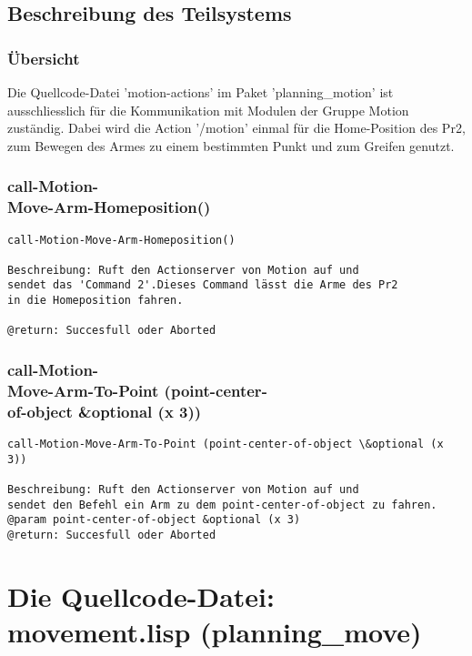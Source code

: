 \documentclass{suturo}
\begin{document}
\subsection{Beschreibung des Teilsystems}
\subsubsection{\"Ubersicht}
Die Quellcode-Datei 'motion-actions' im Paket 'planning\_motion'  ist ausschliesslich für die Kommunikation mit Modulen der Gruppe Motion zuständig. Dabei wird die Action '/motion' einmal für die Home-Position des Pr2, zum Bewegen des Armes zu einem bestimmten Punkt und zum Greifen genutzt.


\subsubsection{call-Motion-\\
Move-Arm-Homeposition()}
\begin{verbatim}
call-Motion-Move-Arm-Homeposition()

Beschreibung: Ruft den Actionserver von Motion auf und
sendet das 'Command 2'.Dieses Command lässt die Arme des Pr2 
in die Homeposition fahren.

@return: Succesfull oder Aborted
\end{verbatim}



\subsubsection{call-Motion-\\
Move-Arm-To-Point (point-center-\\of-object \&optional (x 3))
}
\begin{verbatim}
call-Motion-Move-Arm-To-Point (point-center-of-object \&optional (x 3))

Beschreibung: Ruft den Actionserver von Motion auf und 
sendet den Befehl ein Arm zu dem point-center-of-object zu fahren.
@param point-center-of-object &optional (x 3)
@return: Succesfull oder Aborted
\end{verbatim}

\newpage
\section{Die Quellcode-Datei: movement.lisp (planning\_move)}
\end{document}
